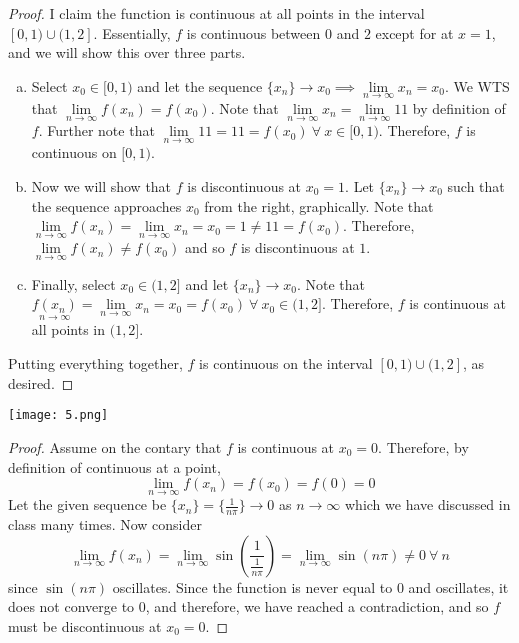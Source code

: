\documentclass[12pt]{scrartcl}
\begin{document}
\begin{proof}
  
\hfill

I claim the function is continuous at all points in the interval $[0, 1) \cup (1, 2]$. Essentially,
$f$ is continuous between $0$ and $2$ except for at $x = 1$, and we will show this over three parts.

\begin{enumerate}[a.]
  \item Select $x_0 \in [0, 1)$ and let the sequence $\{x_n\} \to x_0 \implies \underset{n\to\infty}{\lim}x_n = x_0$. We 
  WTS that $\underset{n\to\infty}{\lim}f(x_n) = f(x_0)$.
  Note that $\underset{n\to\infty}{\lim}x_n = \underset{n\to\infty}{\lim}11$ by definition of $f$. Further note that 
  $\underset{n\to\infty}{\lim}11 = 11 = f(x_0) \ \forall \ x \in [0, 1)$. Therefore, 
  $f$ is continuous on $[0, 1)$. 
  \item Now we will show that $f$ is discontinuous at $x_0 = 1$. Let $\{x_n\} \to x_0$ such that 
  the sequence approaches $x_0$ from the right, graphically. Note that 
  $\underset{n\to\infty}{\lim}f(x_n) = \underset{n\to\infty}{\lim}x_n = x_0 = 1 \neq 11 = f(x_0)$.
  Therefore, $\underset{n\to\infty}{\lim}f(x_n) \neq f(x_0)$ and so $f$ is discontinuous at $1$. 
  \item Finally, select $x_0 \in (1, 2]$ and let $\{x_n\} \to x_0$. Note that 
  $\underset{n\to\infty}{f(x_n)} = \underset{n\to\infty}{\lim}x_n = x_0 = f(x_0) \ \forall \ x_0 \in (1, 2]$. Therefore, 
  $f$ is continuous at all points in $(1, 2]$. 

\end{enumerate}

Putting everything together, $f$ is continuous on the interval $[0, 1) \cup (1, 2]$, as desired.
\end{proof}
\newpage

\texttt{[image: 5.png]}

\begin{proof}
  
\hfill

Assume on the contary that $f$ is continuous at $x_0 = 0$. Therefore, by definition of continuous at a point, 
\[\lim_{n\to\infty}f(x_n) = f(x_0) = f(0) = 0\]
Let the given sequence be $\{x_n\} = \{\frac{1}{n\pi}\} \to 0$ as $n\to\infty$ which we have discussed in class 
many times. Now consider 
\[\lim_{n\to\infty}f(x_n) = \lim_{n\to\infty}\sin(\frac{1}{\frac{1}{n\pi}}) = \lim_{n\to\infty}\sin(n\pi) \neq 0 \ \forall \ n\]
since $\sin(n\pi)$ oscillates. Since the function is never equal to $0$ and oscillates, it does not 
converge to 0, and therefore, we have reached a contradiction, and so $f$ must be discontinuous at $x_0=0$. 
\end{proof}
\newpage
\end{document}
